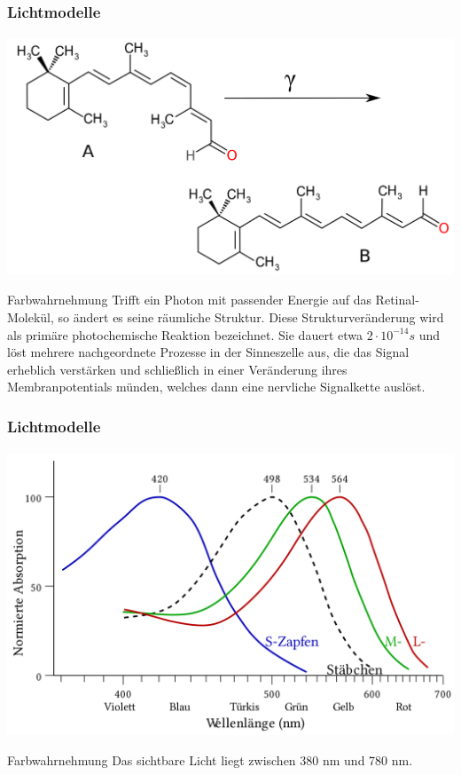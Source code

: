 \documentclass{beamer}
\begin{document}
\begin{frame}
    \frametitle{Lichtmodelle}
\framesubtitle{}
\begin{center}
\includegraphics[scale=0.09]{images/RetinalCisandTrans} 
\end{center}
    \begin{block}{Farbwahrnehmung}
Trifft ein Photon mit passender Energie auf das Retinal-Molekül, so ändert es seine räumliche Struktur. Diese Strukturveränderung wird als primäre photochemische Reaktion bezeichnet. Sie dauert etwa $2 \cdot 10^{-14}s$  und löst mehrere nachgeordnete Prozesse in der Sinneszelle aus, die das Signal erheblich verstärken und schließlich in einer Veränderung ihres Membranpotentials münden, welches dann eine nervliche Signalkette auslöst. 
\end{block}
\end{frame}


\begin{frame}
    \frametitle{Lichtmodelle}
\framesubtitle{}
\begin{center}
\includegraphics[scale=0.14]{images/farbwahrnehmung}
\end{center}
    \begin{block}{Farbwahrnehmung}
Das sichtbare Licht liegt zwischen 380 nm und 780 nm.

\end{block}
\end{frame}
\end{document}
